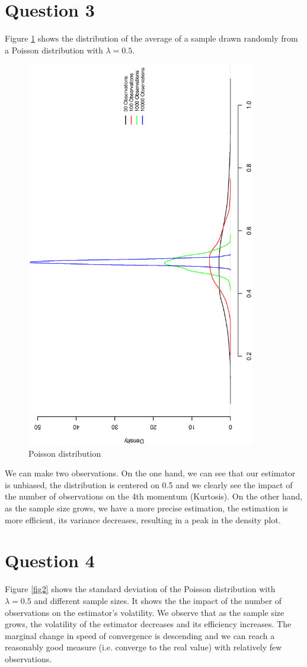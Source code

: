 \section{Question 3}

Figure \ref{fig1} shows the distribution of the average of a sample drawn randomly from a Poisson distribution with $\lambda=0.5$. 
\begin{figure}[ht]
\centering
\includegraphics[width=10cm, angle=270]{Q1_3plot.eps}
\caption{Poisson distribution}
\label{fig1}
\end{figure}
We can make two observations. On the one hand, we can see that our estimator is unbiased, the distribution is centered on 0.5 and we clearly see the impact of the number of observations on the 4th momentum (Kurtosis). On the other hand, as the sample size grows, we have a more precise estimation, the estimation is more efficient, its variance decreases, resulting in a peak in the density plot.


\section{Question 4}
Figure \ref{fig2} shows the standard deviation of the Poisson distribution with  $\lambda=0.5$ and different sample sizes. It shows the the impact of the number of observations on the estimator's volatility. We observe that as the sample size grows, the volatility of the estimator decreases and its efficiency increases.  The marginal change in speed of convergence is descending and we can reach a reasonably good measure (i.e. converge to the real value) with relatively few observations.

